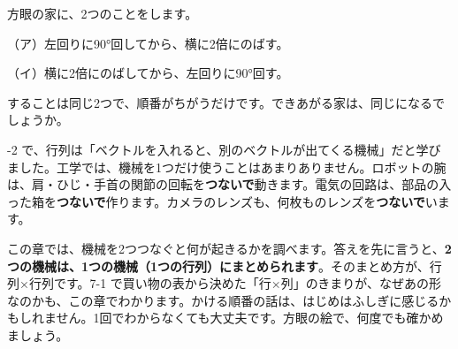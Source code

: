 \begin{hatena}
\noindent\begin{minipage}[c]{0.48\linewidth}
\raggedright
方眼の家に、2つのことをします。

（ア）左回りに90°回してから、横に2倍にのばす。

（イ）横に2倍にのばしてから、左回りに90°回す。

することは同じ2つで、順番がちがうだけです。できあがる家は、同じになるでしょうか。
\end{minipage}\hfill
\begin{minipage}[c]{0.5\linewidth}
\centering
{}
\end{minipage}
\end{hatena}

-2 で、行列は「ベクトルを入れると、別のベクトルが出てくる機械」だと学びました。工学では、機械を1つだけ使うことはあまりありません。ロボットの腕は、肩・ひじ・手首の関節の回転を\textbf{つないで}動きます。電気の回路は、部品の入った箱を\textbf{つないで}作ります。カメラのレンズも、何枚ものレンズを\textbf{つないで}います。

この章では、機械を2つつなぐと何が起きるかを調べます。答えを先に言うと、\textbf{2つの機械は、1つの機械（1つの行列）にまとめられます}。そのまとめ方が、行列×行列です。7-1 で買い物の表から決めた「行×列」のきまりが、なぜあの形なのかも、この章でわかります。かける順番の話は、はじめはふしぎに感じるかもしれません。1回でわからなくても大丈夫です。方眼の絵で、何度でも確かめましょう。

